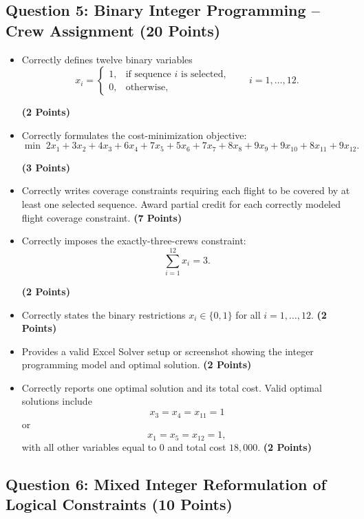 \documentclass[11pt, letterpaper]{article}
\newcommand{\question}[2]{
    \subsection*{Question #1: #2}
}
\newcommand{\points}[1]{
    \textbf{(#1 Points)}
}
\begin{document}
\question{5}{Binary Integer Programming -- Crew Assignment \points{20}}

\begin{itemize}
    \item Correctly defines twelve binary variables
    \[
    x_i=
    \begin{cases}
    1, & \text{if sequence }i\text{ is selected,}\\
    0, & \text{otherwise,}
    \end{cases}
    \qquad i=1,\ldots,12.
    \]
    \points{2}

    \item Correctly formulates the cost-minimization objective:
    \[
    \min \; 2x_1+3x_2+4x_3+6x_4+7x_5+5x_6
    +7x_7+8x_8+9x_9+9x_{10}+8x_{11}+9x_{12}.
    \]
    \points{3}

    \item Correctly writes coverage constraints requiring each flight to be covered
    by at least one selected sequence. Award partial credit for each correctly
    modeled flight coverage constraint. \points{7}

    \item Correctly imposes the exactly-three-crews constraint:
    \[
    \sum_{i=1}^{12}x_i=3.
    \]
    \points{2}

    \item Correctly states the binary restrictions $x_i\in\{0,1\}$ for all
    $i=1,\ldots,12$. \points{2}

    \item Provides a valid Excel Solver setup or screenshot showing the integer
    programming model and optimal solution. \points{2}

    \item Correctly reports one optimal solution and its total cost. Valid optimal
    solutions include
    \[
    x_3=x_4=x_{11}=1
    \]
    or
    \[
    x_1=x_5=x_{12}=1,
    \]
    with all other variables equal to 0 and total cost $18{,}000$. \points{2}
\end{itemize}


\question{6}{Mixed Integer Reformulation of Logical Constraints \points{10}}
\end{document}
